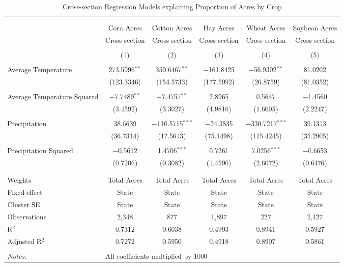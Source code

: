 \documentclass[10pt]{article}
\begin{document}
\newpage
\begin{table}[!htbp] \centering 
  \caption{Cross-section Regression Models explaining Proportion of Acres by Crop} 
  \label{} 
\footnotesize 
\begin{tabular}{@{\extracolsep{5pt}}lccccc} 
\\[-1.8ex]\hline 
\hline \\[-1.8ex] 
\\[-1.8ex] & Corn Acres & Cotton Acres & Hay Acres & Wheat Acres & Soybean Acres \\ 
 & Cross-section & Cross-section & Cross-section & Cross-section & Cross-section \\ 
\\[-1.8ex] & (1) & (2) & (3) & (4) & (5)\\ 
\hline \\[-1.8ex] 
 Average Temperature & 273.5996$^{**}$ & 350.6467$^{**}$ & $-$161.8425 & $-$56.9302$^{**}$ & 81.0202 \\ 
  & (123.3346) & (154.5733) & (177.5992) & (26.8759) & (81.0352) \\ 
  & & & & & \\ 
 Average Temperature Squared & $-$7.7489$^{**}$ & $-$7.4757$^{**}$ & 2.8965 & 0.5647 & $-$1.4560 \\ 
  & (3.4592) & (3.3027) & (4.9816) & (1.6005) & (2.2247) \\ 
  & & & & & \\ 
 Precipitation & 38.6639 & $-$110.5715$^{***}$ & $-$24.3835 & $-$330.7217$^{***}$ & 39.1313 \\ 
  & (36.7314) & (17.5613) & (75.1498) & (115.4245) & (35.2905) \\ 
  & & & & & \\ 
 Precipitation Squared & $-$0.5612 & 1.4706$^{***}$ & 0.7261 & 7.0256$^{***}$ & $-$0.6653 \\ 
  & (0.7206) & (0.3082) & (1.4596) & (2.6072) & (0.6476) \\ 
  & & & & & \\ 
\hline \\[-1.8ex] 
Weights & Total Acres & Total Acres & Total Acres & Total Acres & Total Acres \\ 
Fixed-effect & State & State & State & State & State \\ 
Cluster SE & State & State & State & State & State \\ 
Observations & 2,348 & 877 & 1,897 & 227 & 2,127 \\ 
R$^{2}$ & 0.7312 & 0.6038 & 0.4993 & 0.8941 & 0.5927 \\ 
Adjusted R$^{2}$ & 0.7272 & 0.5950 & 0.4918 & 0.8907 & 0.5861 \\ 
\hline 
\hline \\[-1.8ex] 
\textit{Notes:} & \multicolumn{5}{l}{All coefficients multiplied by 1000} \\ 
\end{tabular} 
\end{table} 
\end{document}
